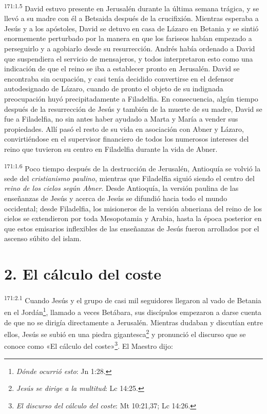 \par
\textsuperscript{171:1.5} David estuvo presente en Jerusalén durante la última semana trágica, y se llevó a su madre con él a Betsaida después de la crucifixión. Mientras esperaba a Jesús y a los apóstoles, David se detuvo en casa de Lázaro en Betania y se sintió enormemente perturbado por la manera en que los fariseos habían empezado a perseguirlo y a agobiarlo desde su resurrección. Andrés había ordenado a David que suspendiera el servicio de mensajeros, y todos interpretaron esto como una indicación de que el reino se iba a establecer pronto en Jerusalén. David se encontraba sin ocupación, y casi tenía decidido convertirse en el defensor autodesignado de Lázaro, cuando de pronto el objeto de su indignada preocupación huyó precipitadamente a Filadelfia. En consecuencia, algún tiempo después de la resurrección de Jesús y también de la muerte de su madre, David se fue a Filadelfia, no sin antes haber ayudado a Marta y María a vender sus propiedades. Allí pasó el resto de su vida en asociación con Abner y Lázaro, convirtiéndose en el supervisor financiero de todos los numerosos intereses del reino que tuvieron su centro en Filadelfia durante la vida de Abner.

\par
\textsuperscript{171:1.6} Poco tiempo después de la destrucción de Jerusalén, Antioquía se volvió la sede del \textit{cristianismo paulino}, mientras que Filadelfia siguió siendo el centro del \textit{reino de los cielos según Abner}. Desde Antioquía, la versión paulina de las enseñanzas de Jesús y acerca de Jesús se difundió hacia todo el mundo occidental; desde Filadelfia, los misioneros de la versión abneriana del reino de los cielos se extendieron por toda Mesopotamia y Arabia, hasta la época posterior en que estos emisarios inflexibles de las enseñanzas de Jesús fueron arrollados por el ascenso súbito del islam.

\section*{2. El cálculo del coste}
\par
\textsuperscript{171:2.1} Cuando Jesús y el grupo de casi mil seguidores llegaron al vado de Betania en el Jordán\footnote{\textit{Dónde ocurrió esto}: Jn 1:28.}, llamado a veces Betábara, sus discípulos empezaron a darse cuenta de que no se dirigía directamente a Jerusalén. Mientras dudaban y discutían entre ellos, Jesús se subió en una piedra gigantesca\footnote{\textit{Jesús se dirige a la multitud}: Lc 14:25.} y pronunció el discurso que se conoce como «El cálculo del coste»\footnote{\textit{El discurso del cálculo del coste}: Mt 10:21,37; Lc 14:26.}. El Maestro dijo:

